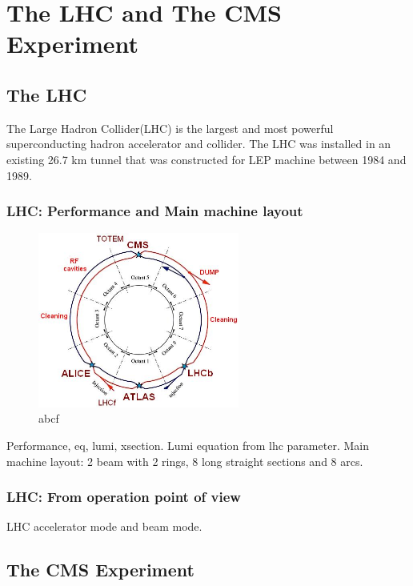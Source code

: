 \chapter{The LHC and The CMS Experiment}

\section{The LHC}
The Large Hadron Collider(LHC) is the largest and most powerful superconducting hadron accelerator and collider. The LHC was installed in an existing 26.7 km tunnel that was constructed for LEP machine between 1984 and 1989. 
\subsection{LHC: Performance and Main machine layout}

\begin{figure}[htbp]
\begin{center}
\includegraphics[width=0.59\textwidth]{figures/c3/c3_lhc_latticelayout.jpg}
\end{center}
\caption{abcf}
\label{fig:c3lhclayout}
\end{figure}

Performance, eq, lumi, xsection. Lumi equation from lhc parameter.
Main machine layout: 2 beam with 2 rings, 8 long straight sections and 8 arcs.
\subsection{LHC: From operation point of view}
LHC accelerator mode and beam mode. 

\section{The CMS Experiment}

